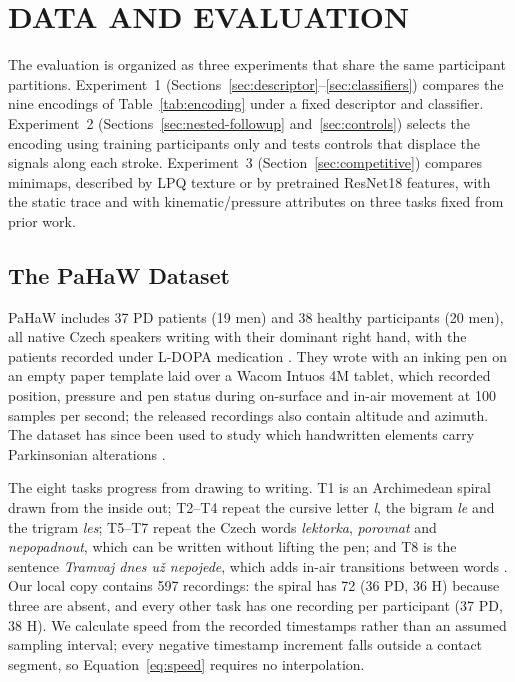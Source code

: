 \section{\uppercase{Data and Evaluation}}
\label{sec:protocol}

\noindent
The evaluation is organized as three experiments that share the same participant partitions. Experiment~1 (Sections~\ref{sec:descriptor}--\ref{sec:classifiers}) compares the nine encodings of Table~\ref{tab:encoding} under a fixed descriptor and classifier. Experiment~2 (Sections~\ref{sec:nested-followup} and~\ref{sec:controls}) selects the encoding using training participants only and tests controls that displace the signals along each stroke. Experiment~3 (Section~\ref{sec:competitive}) compares minimaps, described by LPQ texture or by pretrained ResNet18 features, with the static trace and with kinematic/pressure attributes on three tasks fixed from prior work.

\subsection{The PaHaW Dataset}
\label{sec:dataset}
\noindent
PaHaW includes 37 PD patients (19 men) and 38 healthy participants (20 men), all native Czech speakers writing with their dominant right hand, with the patients recorded under L-DOPA medication \cite{Drotar2016}. They wrote with an inking pen on an empty paper template laid over a Wacom Intuos 4M tablet, which recorded position, pressure and pen status during on-surface and in-air movement at 100 samples per second; the released recordings also contain altitude and azimuth. The dataset has since been used to study which handwritten elements carry Parkinsonian alterations \cite{Casademunt2024}.

The eight tasks progress from drawing to writing. T1 is an Archimedean spiral drawn from the inside out; T2--T4 repeat the cursive letter \textit{l}, the bigram \textit{le} and the trigram \textit{les}; T5--T7 repeat the Czech words \textit{lektorka}, \textit{porovnat} and \textit{nepopadnout}, which can be written without lifting the pen; and T8 is the sentence \textit{Tramvaj dnes u\v{z} nepojede}, which adds in-air transitions between words \cite{Drotar2016}. Our local copy contains 597 recordings: the spiral has 72 (36 PD, 36 H) because three are absent, and every other task has one recording per participant (37 PD, 38 H). We calculate speed from the recorded timestamps rather than an assumed sampling interval; every negative timestamp increment falls outside a contact segment, so Equation~\ref{eq:speed} requires no interpolation.


